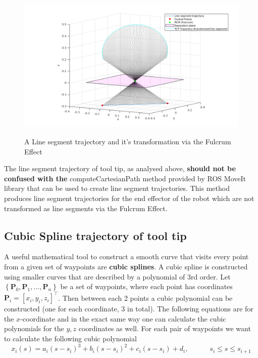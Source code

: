 \begin{center}
\begin{figure}[!htb]
\centering
\includegraphics[width=\textwidth]{images/rcm_trajectories/rcm_lineseg_traj.png}\\
\caption{A Line segment trajectory and it's transformation via the Fulcrum Effect}
\end{figure}
\end{center}

The line segment trajectory of tool tip, as analysed above, \textbf{should not be confused with the} computeCartesianPath method provided by ROS MoveIt library that can be used to create line segment 
trajectories. This method produces line segment trajectories for the end effector of the robot which are not transformed as line segments via the Fulcrum Effect.

\subsection{Cubic Spline trajectory of tool tip}

A useful mathematical tool to construct a smooth curve that visits every point from a given set of waypoints are \textbf{cubic splines}. A cubic spline is 
constructed using smaller curves that are described by a polynomial of 3rd order. Let $\left\lbrace \mathbf{P}_0, \mathbf{P}_1, \ldots , \mathbf{P}_n \right\rbrace$ 
be a set of waypoints, where each point has coordinates $\mathbf{P}_i = [x_i, y_i, z_i]^\top$. Then between each 2 points a cubic 
polynomial can be constructed (one for each coordinate, 3 in total). The following equations are for the $x$-coordinate and in the exact same way one can 
calculate the cubic polynomials for the $y,z$ coordinates as well. For each pair of waypoints we want to calculate the following cubic polynomial
\begin{equation}
\label{cubic-polynomial}
x_i(s) = a_i(s-s_i)^3 + b_i(s-s_i)^2 + c_i(s-s_i) + d_i, \hspace{3em} s_i \leqslant s \leqslant s_{i+1}
\end{equation}

